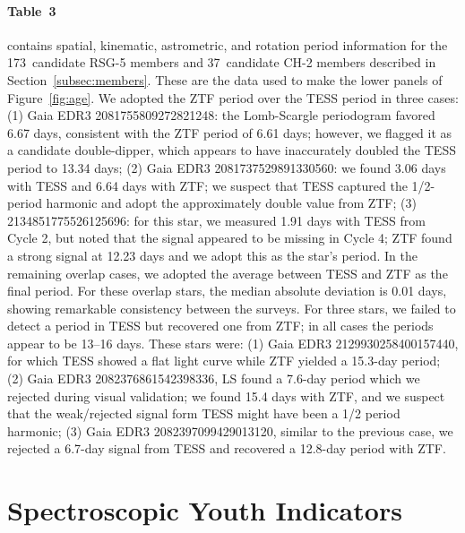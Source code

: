 \documentclass[12pt,twocolumn]{aastex63}
\newcommand{\nchtwo}{37} %
\newcommand{\nrsgfive}{173} %
\begin{document}
\paragraph{Table~3} contains spatial, kinematic, astrometric, and
rotation period information for the \nrsgfive\ candidate RSG-5 members
and \nchtwo\ candidate CH-2 members described in
Section~\ref{subsec:members}.  These are the data used to make the
lower panels of Figure~\ref{fig:age}. 
We adopted the ZTF period over the
TESS period in three cases: (1) Gaia EDR3 2081755809272821248: the
Lomb-Scargle periodogram favored 6.67 days, consistent with the ZTF
period of 6.61 days; however, we flagged it as a candidate
double-dipper, which appears to have inaccurately doubled the TESS
period to 13.34 days; (2) Gaia EDR3 2081737529891330560: we found 3.06
days with TESS and 6.64 days with ZTF; we suspect that TESS captured
the 1/2-period harmonic and adopt the approximately double value from
ZTF; (3) 2134851775526125696: for this star, we measured 1.91 days
with TESS from Cycle 2, but noted that the signal appeared to be
missing in Cycle 4; ZTF found a strong signal at 12.23 days and we
adopt this as the star's period. In the remaining overlap cases, we
adopted the average between TESS and ZTF as the final period. For
these overlap stars, the median absolute deviation is 0.01 days,
showing remarkable consistency between the surveys. For three stars,
we failed to detect a period in TESS but recovered one from ZTF; in
all cases the periods appear to be 13--16 days.  These stars were: (1)
Gaia EDR3 2129930258400157440, for which TESS showed a flat light
curve while ZTF yielded a 15.3-day period; (2) Gaia EDR3
2082376861542398336, LS found a 7.6-day period which we rejected
during visual validation; we found 15.4 days with ZTF, and we suspect
that the weak/rejected signal form TESS might have been a 1/2 period
harmonic; (3) Gaia EDR3 2082397099429013120, similar to the previous
case, we rejected a 6.7-day signal from TESS and recovered a 12.8-day
period with ZTF. 


\section{Spectroscopic Youth Indicators}
\label{app:spectra}
\end{document}
